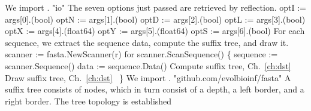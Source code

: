 We import .
\nwenddocs{}\plusendmoddef\nwstartdeflinemarkup{}\nwenddeflinemarkup
"io"
\nwendcode{}\nwdocspar
The seven options just passed are retrieved by reflection.
\nwenddocs{}\endmoddef\nwstartdeflinemarkup{}\nwenddeflinemarkup
optI := args[0].(bool)
optN := args[1].(bool)
optD := args[2].(bool)
optL := args[3].(bool)
optX := args[4].(float64)
optY := args[5].(float64)
optS := args[6].(bool)
\nwendcode{}\nwdocspar
For each sequence, we extract the sequence data, compute the suffix
tree, and draw it.
\nwenddocs{}\endmoddef\nwstartdeflinemarkup{}\nwenddeflinemarkup
scanner := fasta.NewScanner(r)
for scanner.ScanSequence() \{
          sequence := scanner.Sequence()
          data := sequence.Data()
          \LA{}Compute suffix tree, Ch.~\ref{ch:dst}~{\nwtagstyle{}}\RA{}
          \LA{}Draw suffix tree, Ch.~\ref{ch:dst}~{\nwtagstyle{}}\RA{}
\}
\nwendcode{}\nwdocspar
We import .
\nwenddocs{}\plusendmoddef\nwstartdeflinemarkup{}\nwenddeflinemarkup
"github.com/evolbioinf/fasta"
\nwendcode{}\nwdocspar
A suffix tree consists of nodes, which in turn consist of a depth, a
left border, and a right border. The tree topology is established
